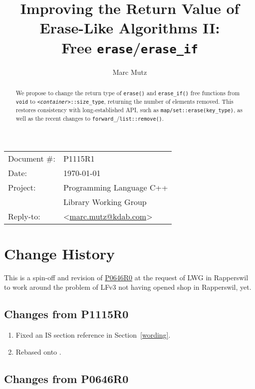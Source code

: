 \documentclass[11pt]{article}
\date{}
\title{Improving the Return Value of Erase-Like Algorithms II:\\ Free
  \texttt{erase}/\texttt{erase\_if}}
\makeatletter
\newcommand{\emailaddress}{marc.mutz@kdab.com}
\newcommand{\email}{\href{mailto:\emailaddress}{\emailaddress}}
\newcommand{\wgpaper}[1]{\href{https://wg21.link/#1}{#1}}
\newcommand{\cst}{\texttt{\textit{<container>}::size\_type}}
\makeatother
\begin{document}
\maketitle\vspace{-2cm}

\begin{tabular}{ll}
  Document \#:&P1115R1\\
  Date:       &\today\\
  Project:    &Programming Language C++\\
              &Library Working Group\\
  Reply-to:   &\author{Marc Mutz} \textless\email\textgreater
\end{tabular}
\vspace{1cm}
\begin{abstract}
  We propose to change the return type of \texttt{erase()} and
  \texttt{erase\_if()} free functions from \texttt{void} to \cst,
  returning the number of elements removed. This restores consistency
  with long-established API, such as
  \texttt{map/set::erase(key\_type)}, as well as the recent changes to
  \texttt{forward\_}/\texttt{list::remove()}.
\end{abstract}


\tableofcontents

\section{Change History}

This is a spin-off and revision of \wgpaper{P0646R0} at the request of
LWG in Rapperswil to work around the problem of LFv3 not having opened
shop in Rapperswil, yet.

\subsection{Changes from P1115R0}

\begin{enumerate}
\item Fixed an IS section reference in Section~\ref{wording}.
\item Rebased onto \cite{N4830}.
\end{enumerate}

\subsection{Changes from P0646R0}
\end{document}
